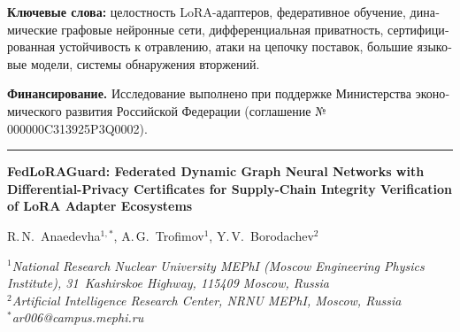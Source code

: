 \documentclass[12pt,a4paper]{article}
\theoremstyle{definition}
\theoremstyle{remark}
\newcommand{\modelname}{FedLoRAGuard}
\begin{document}
\begin{otherlanguage}{russian}
\vspace{0.4em}

\noindent\textbf{Ключевые слова:} целостность LoRA-адаптеров, федеративное обучение, динамические графовые нейронные сети, дифференциальная приватность, сертифицированная устойчивость к отравлению, атаки на цепочку поставок, большие языковые модели, системы обнаружения вторжений.

\vspace{0.4em}

\noindent\textbf{Финансирование.} Исследование выполнено при поддержке Министерства экономического развития Российской Федерации (соглашение № 000000C313925P3Q0002).
\end{otherlanguage}

\vspace{1.0em}
\hrule
\vspace{0.6em}


\begin{center}
{\large\bfseries
\modelname{}: Federated Dynamic Graph Neural Networks with
Differential-Privacy Certificates for Supply-Chain Integrity
Verification of LoRA Adapter Ecosystems
\par}

\vspace{0.6em}

{\normalsize
R.\,N.~Anaedevha$^{1,*}$, A.\,G.~Trofimov$^{1}$, Y.\,V.~Borodachev$^{2}$
\par}

\vspace{0.4em}

{\small\itshape
$^{1}$National Research Nuclear University MEPhI
(Moscow Engineering Physics Institute), 31~Kashirskoe Highway,
115409 Moscow, Russia\\
$^{2}$Artificial Intelligence Research Center, NRNU MEPhI, Moscow, Russia\\
$^{*}$ar006@campus.mephi.ru
\par}
\end{center}

\vspace{0.5em}
\end{document}
